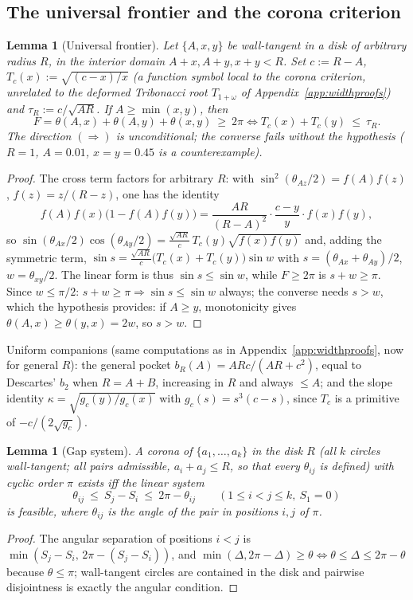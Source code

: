 \documentclass[11pt]{article}
\newtheorem{lemma}[theorem]{Lemma}
\theoremstyle{definition}
\begin{document}
\subsection{The universal frontier and the corona criterion}
\label{app:corona-app}

\begin{lemma}[Universal frontier]\label{lem:DU}
Let $\{A,x,y\}$ be wall-tangent in a disk of arbitrary radius $R$, in the
interior domain $A+x,A+y,x+y<R$. Set $c:=R-A$,
$T_c(x):=\sqrt{(c-x)/x}$ (a function symbol local to the corona
criterion, unrelated to the deformed Tribonacci root $T_{1+\omega}$ of
Appendix~\ref{app:widthproofs}) and $\tau_R:=c/\sqrt{AR}$. If $A\ge\min(x,y)$,
then
\[
F=\theta(A,x)+\theta(A,y)+\theta(x,y)\ \ge\ 2\pi
\iff T_c(x)+T_c(y)\ \le\ \tau_R .
\]
The direction $(\Rightarrow)$ is unconditional; the converse fails without
the hypothesis ($R=1$, $A=0.01$, $x=y=0.45$ is a counterexample).
\end{lemma}
\begin{proof}
The cross term factors for arbitrary $R$: with
$\sin^2(\theta_{Az}/2)=f(A)f(z)$, $f(z)=z/(R-z)$, one has the identity
\[
f(A)f(x)\bigl(1-f(A)f(y)\bigr)
=\frac{AR}{(R-A)^2}\cdot\frac{c-y}{y}\cdot f(x)f(y),
\]
so
$\sin(\theta_{Ax}/2)\cos(\theta_{Ay}/2)
=\tfrac{\sqrt{AR}}{c}\,T_c(y)\sqrt{f(x)f(y)}$ and, adding the symmetric
term, $\sin s=\tfrac{\sqrt{AR}}{c}\bigl(T_c(x)+T_c(y)\bigr)\sin w$ with
$s=(\theta_{Ax}+\theta_{Ay})/2$, $w=\theta_{xy}/2$. The linear form is
thus $\sin s\le\sin w$, while $F\ge2\pi$ is $s+w\ge\pi$. Since
$w\le\pi/2$: $s+w\ge\pi\Rightarrow\sin s\le\sin w$ always; the converse
needs $s>w$, which the hypothesis provides: if $A\ge y$, monotonicity
gives $\theta(A,x)\ge\theta(y,x)=2w$, so $s>w$.
\end{proof}

Uniform companions (same computations as in
Appendix~\ref{app:widthproofs}, now for general $R$): the general pocket
$b_R(A)=ARc/(AR+c^2)$, equal to Descartes' $b_2$ when $R=A+B$, increasing
in $R$ and always $\le A$; and the slope identity
$\kappa=\sqrt{g_c(y)/g_c(x)}$ with $g_c(s)=s^3(c-s)$, since $T_c$ is a
primitive of $-c/(2\sqrt{g_c})$.

\begin{lemma}[Gap system]\label{lem:Dgaps}
A \emph{corona} of $\{a_1,\dots,a_k\}$ in the disk $R$ (all $k$ circles
wall-tangent; all pairs admissible, $a_i+a_j\le R$, so that every
$\theta_{ij}$ is defined) with cyclic order $\pi$ exists iff the linear system
\[
\theta_{ij}\ \le\ S_j-S_i\ \le\ 2\pi-\theta_{ij}
\qquad(1\le i<j\le k,\ S_1=0)
\]
is feasible, where $\theta_{ij}$ is the angle of the pair in positions
$i,j$ of $\pi$.
\end{lemma}
\begin{proof}
The angular separation of positions $i<j$ is
$\min(S_j-S_i,\,2\pi-(S_j-S_i))$, and
$\min(\Delta,2\pi-\Delta)\ge\theta\iff\theta\le\Delta\le2\pi-\theta$
because $\theta\le\pi$; wall-tangent circles are contained in the disk and
pairwise disjointness is exactly the angular condition.
\end{proof}
\end{document}
